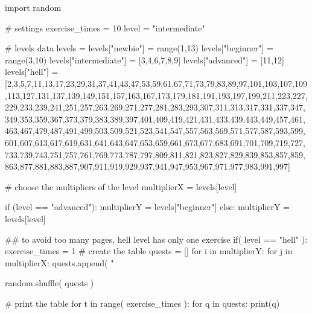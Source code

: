 \documentclass{article}
\begin{document}
\begin{multicols}{6}

\large
{}
\noindent 
\begin{pycode}
import random

# settings 
exercise_times = 10
level = "intermediate"

# levels data
levels = {}
levels["newbie"]   = range(1,13)
levels["beginner"] = range(3,10)
levels["intermediate"] = [3,4,6,7,8,9]
levels["advanced"]     = [11,12]
levels["hell"] = [2,3,5,7,11,13,17,23,29,31,37,41,43,47,53,59,61,67,71,73,79,83,89,97,101,103,107,109,113,127,131,137,139,149,151,157,163,167,173,179,181,191,193,197,199,211,223,227,229,233,239,241,251,257,263,269,271,277,281,283,293,307,311,313,317,331,337,347,349,353,359,367,373,379,383,389,397,401,409,419,421,431,433,439,443,449,457,461,463,467,479,487,491,499,503,509,521,523,541,547,557,563,569,571,577,587,593,599,601,607,613,617,619,631,641,643,647,653,659,661,673,677,683,691,701,709,719,727,733,739,743,751,757,761,769,773,787,797,809,811,821,823,827,829,839,853,857,859,863,877,881,883,887,907,911,919,929,937,941,947,953,967,971,977,983,991,997]

# choose the multipliers of the level
multiplierX = levels[level]

if (level == "advanced"):
    multiplierY = levels["beginner"]
else:
    multiplierY = levels[level]

## to avoid too many pages, hell level has only one exercise
if( level == "hell" ):
    exercise_times = 1  
# create the table
quests = []
for i in multiplierY:
    for j in multiplierX:
        quests.append( "%

random.shuffle( quests )

# print the table
for t in range( exercise_times ):
    for q in quests:
        print(q)

\end{pycode}
\end{multicols}
\end{document}
